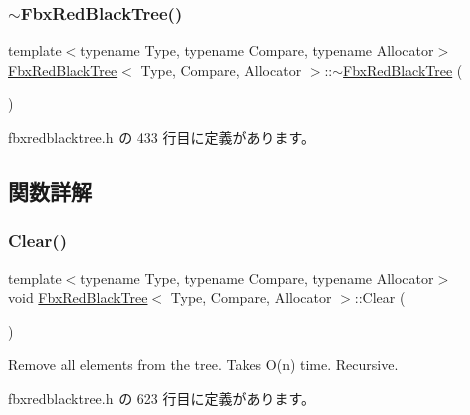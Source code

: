 \subsubsection{\texorpdfstring{$\sim$\+Fbx\+Red\+Black\+Tree()}{~FbxRedBlackTree()}}
{\footnotesize\ttfamily template$<$typename Type, typename Compare, typename Allocator$>$ \\
\hyperlink{class_fbx_red_black_tree}{Fbx\+Red\+Black\+Tree}$<$ Type, Compare, Allocator $>$\+::$\sim$\hyperlink{class_fbx_red_black_tree}{Fbx\+Red\+Black\+Tree} (\begin{DoxyParamCaption}{ }\end{DoxyParamCaption})\hspace{0.3cm}{\ttfamily [inline]}}



 fbxredblacktree.\+h の 433 行目に定義があります。



\subsection{関数詳解}
\mbox{\label{class_fbx_red_black_tree_aa762c1d9c1b533045066f713def691e2}} 
\subsubsection{\texorpdfstring{Clear()}{Clear()}}
{\footnotesize\ttfamily template$<$typename Type, typename Compare, typename Allocator$>$ \\
void \hyperlink{class_fbx_red_black_tree}{Fbx\+Red\+Black\+Tree}$<$ Type, Compare, Allocator $>$\+::Clear (\begin{DoxyParamCaption}{ }\end{DoxyParamCaption})\hspace{0.3cm}{\ttfamily [inline]}}

Remove all elements from the tree. Takes O(n) time. Recursive. 

 fbxredblacktree.\+h の 623 行目に定義があります。

\mbox{\label{class_fbx_red_black_tree_af958bdb74b133aff94c460e956b78859}} 
